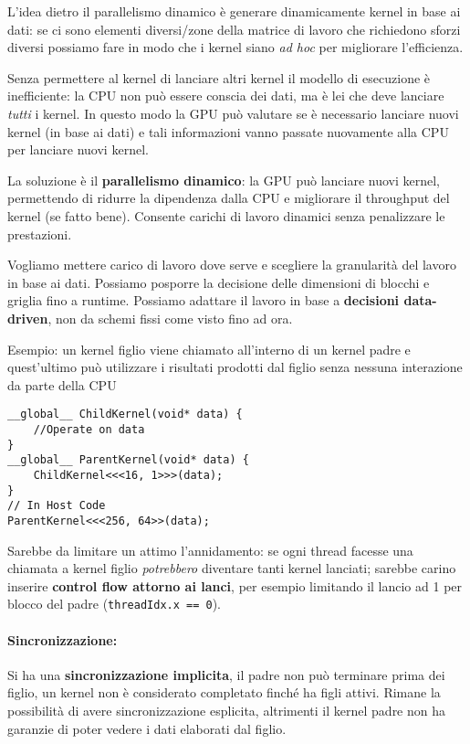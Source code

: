 L'idea dietro il parallelismo dinamico è generare dinamicamente kernel in base ai dati: se ci sono elementi diversi/zone della matrice di lavoro che richiedono sforzi diversi possiamo fare in modo che i kernel siano \textit{ad hoc} per migliorare l'efficienza.

Senza permettere al kernel di lanciare altri kernel il modello di esecuzione è inefficiente: la CPU non può essere conscia dei dati, ma è lei che deve lanciare \textit{tutti} i kernel. In questo modo la GPU può valutare se è necessario lanciare nuovi kernel (in base ai dati) e tali informazioni vanno passate nuovamente alla CPU per lanciare nuovi kernel.

La soluzione è il \textbf{parallelismo dinamico}: la GPU può lanciare nuovi kernel, permettendo di ridurre la dipendenza dalla CPU e migliorare il throughput del kernel (se fatto bene). Consente carichi di lavoro dinamici senza penalizzare le prestazioni.

Vogliamo mettere carico di lavoro dove serve e scegliere la granularità del lavoro in base ai dati. Possiamo posporre la decisione delle dimensioni di blocchi e griglia fino a runtime. Possiamo adattare il lavoro in base a \textbf{decisioni data-driven}, non da schemi fissi come visto fino ad ora.

Esempio: un kernel figlio viene chiamato all'interno di un kernel padre e quest'ultimo può utilizzare i risultati prodotti dal figlio senza nessuna interazione da parte della CPU
\begin{verbatim}
__global__ ChildKernel(void* data) {
	//Operate on data
}
__global__ ParentKernel(void* data) {
	ChildKernel<<<16, 1>>>(data);
}
// In Host Code
ParentKernel<<<256, 64>>(data);
\end{verbatim}

Sarebbe da limitare un attimo l'annidamento: se ogni thread facesse una chiamata a kernel figlio \textit{potrebbero} diventare tanti kernel lanciati; sarebbe carino inserire \textbf{control flow attorno ai lanci}, per esempio limitando il lancio ad 1 per blocco del padre (\texttt{threadIdx.x == 0}).

\paragraph{Sincronizzazione:} Si ha una \textbf{sincronizzazione implicita}, il padre non può terminare prima dei figlio, un kernel non è considerato completato finché ha figli attivi. Rimane la possibilità di avere sincronizzazione esplicita, altrimenti il kernel padre non ha garanzie di poter vedere i dati elaborati dal figlio.

